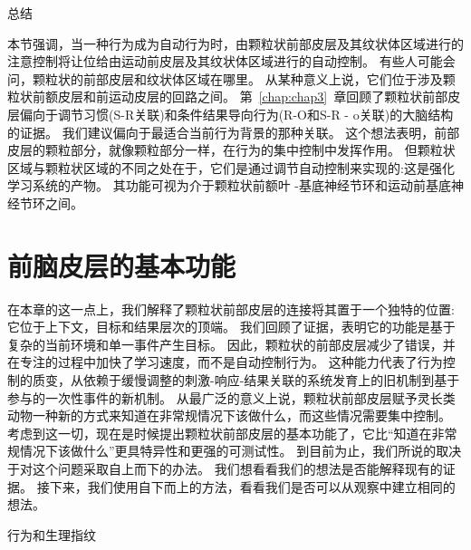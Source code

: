 总结

本节强调，当一种行为成为自动行为时，由颗粒状前部皮层及其纹状体区域进行的注意控制将让位给由运动前皮层及其纹状体区域进行的自动控制。
有些人可能会问，颗粒状的前部皮层和纹状体区域在哪里。
从某种意义上说，它们位于涉及颗粒状前额皮层和前运动皮层的回路之间。
第~\ref{chap:chap3}~章回顾了颗粒状前部皮层偏向于调节习惯(S-R关联)和条件结果导向行为(R-O和S-R - o关联)的大脑结构的证据。
我们建议偏向于最适合当前行为背景的那种关联。
这个想法表明，前部皮层的颗粒部分，就像颗粒部分一样，在行为的集中控制中发挥作用。
但颗粒状区域与颗粒状区域的不同之处在于，它们是通过调节自动控制来实现的:这是强化学习系统的产物。
其功能可视为介于颗粒状前额叶 -基底神经节环和运动前基底神经节环之间。



\section{前脑皮层的基本功能}

在本章的这一点上，我们解释了颗粒状前部皮层的连接将其置于一个独特的位置:它位于上下文，目标和结果层次的顶端。
我们回顾了证据，表明它的功能是基于复杂的当前环境和单一事件产生目标。
因此，颗粒状的前部皮层减少了错误，并在专注的过程中加快了学习速度，而不是自动控制行为。
这种能力代表了行为控制的质变，从依赖于缓慢调整的刺激-响应-结果关联的系统发育上的旧机制到基于参与的一次性事件的新机制。
从最广泛的意义上说，颗粒状前部皮层赋予灵长类动物一种新的方式来知道在非常规情况下该做什么\cite{wise2008forward}，而这些情况需要集中控制。
考虑到这一切，现在是时候提出颗粒状前部皮层的基本功能了，它比“知道在非常规情况下该做什么”更具特异性和更强的可测试性。
到目前为止，我们所说的取决于对这个问题采取自上而下的办法。
我们想看看我们的想法是否能解释现有的证据。
接下来，我们使用自下而上的方法，看看我们是否可以从观察中建立相同的想法。



行为和生理指纹

